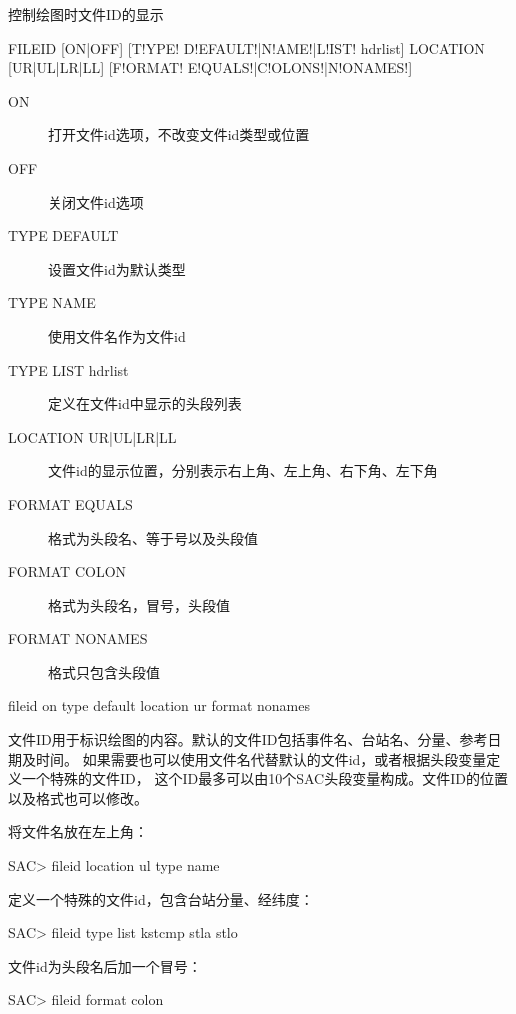 \label{cmd:fileid}

控制绘图时文件ID的显示

\begin{SACSTX}
FILEID [ON|OFF] [T!YPE! D!EFAULT!|N!AME!|L!IST! hdrlist]
    LOCATION [UR|UL|LR|LL] [F!ORMAT! E!QUALS!|C!OLONS!|N!ONAMES!]
\end{SACSTX}

\begin{description}
\item [ON] 打开文件id选项，不改变文件id类型或位置
\item [OFF] 关闭文件id选项
\item [TYPE DEFAULT] 设置文件id为默认类型
\item [TYPE NAME] 使用文件名作为文件id
\item [TYPE LIST hdrlist] 定义在文件id中显示的头段列表
\item [LOCATION UR|UL|LR|LL] 文件id的显示位置，分别表示右上角、左上角、右下角、左下角
\item [FORMAT EQUALS] 格式为头段名、等于号以及头段值
\item [FORMAT COLON] 格式为头段名，冒号，头段值
\item [FORMAT NONAMES] 格式只包含头段值
\end{description}

\begin{SACDFT}
fileid on type default location ur format nonames
\end{SACDFT}

文件ID用于标识绘图的内容。默认的文件ID包括事件名、台站名、分量、参考日期及时间。
如果需要也可以使用文件名代替默认的文件id，或者根据头段变量定义一个特殊的文件ID，
这个ID最多可以由10个SAC头段变量构成。文件ID的位置以及格式也可以修改。

将文件名放在左上角：
\begin{SACCode}
SAC> fileid location ul type name
\end{SACCode}

定义一个特殊的文件id，包含台站分量、经纬度：
\begin{SACCode}
SAC> fileid type list kstcmp stla stlo
\end{SACCode}

文件id为头段名后加一个冒号：
\begin{SACCode}
SAC> fileid format colon
\end{SACCode}

